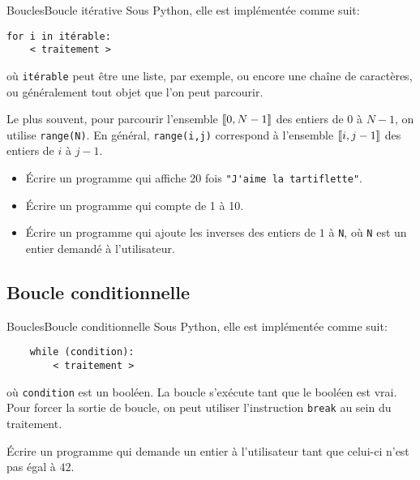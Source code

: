 \begin{frame}[fragile]{Boucles}{Boucle itérative}
Sous Python, elle est implémentée comme suit:
\begin{lstlisting}
for i in itérable:
    < traitement >
\end{lstlisting}
où \lstinline|itérable| peut être une liste, par exemple, ou encore une chaîne de caractères, ou généralement tout objet que l'on peut parcourir.
\pause

Le plus souvent, pour parcourir l'ensemble $[\![0,N-1]\!]$ des entiers de $0$ à $N-1$, on utilise \lstinline|range(N)|. En général, \lstinline|range(i,j)| correspond à l'ensemble $[\![i,j-1]\!]$ des entiers de $i$ à $j-1$.
\pause

	\begin{exo}
		\begin{itemize}[<+->]
		\item Écrire un programme qui affiche 20 fois \lstinline|"J'aime la tartiflette"|.
		
		\item Écrire un programme qui compte de 1 à 10.
		
		\item Écrire un programme qui ajoute les inverses des entiers de $1$ à \lstinline|N|, où \lstinline|N| est un entier demandé à l'utilisateur.
		\end{itemize}
	\end{exo}
\end{frame}

\subsection{Boucle conditionnelle}

\begin{frame}[fragile]{Boucles}{Boucle conditionnelle}
	Sous Python, elle est implémentée comme suit:
	\begin{lstlisting}
	while (condition):
	    < traitement >
	\end{lstlisting}
	où \lstinline|condition| est un booléen. La boucle s'exécute tant que le booléen est vrai.\pause
	Pour forcer la sortie de boucle, on peut utiliser l'instruction \lstinline|break| au sein du traitement.\pause
		
	\begin{exo}
		Écrire un programme qui demande un entier à l'utilisateur tant que celui-ci n'est pas égal à $42$.
	\end{exo}
\end{frame}

